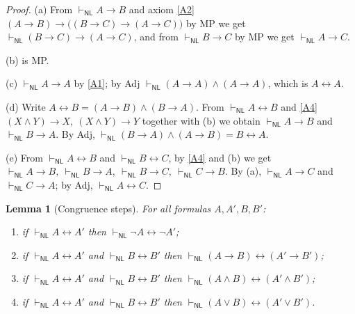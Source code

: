 \documentclass[12pt]{article}
\newtheorem{lemma}{Lemma}
\theoremstyle{definition}
\newcommand{\NL}{\mathsf{NL}}
\newcommand{\prv}{\vdash_{\NL}}
\newcommand{\imp}{\rightarrow}
\newcommand{\bic}{\leftrightarrow}
\begin{document}
\begin{proof}
(a) From $\prv A\imp B$ and axiom \eqref{A2}
$(A\imp B)\imp\big((B\imp C)\imp(A\imp C)\big)$ by MP we get
$\prv (B\imp C)\imp(A\imp C)$, and from $\prv B\imp C$ by MP we get
$\prv A\imp C$.

(b) is MP.

(c) $\prv A\imp A$ by \eqref{A1}; by Adj
$\prv (A\imp A)\wedge(A\imp A)$, which is $A\bic A$.

(d) Write $A\bic B=(A\imp B)\wedge(B\imp A)$. From $\prv A\bic B$ and \eqref{A4}
$(X\wedge Y)\imp X,\ (X\wedge Y)\imp Y$ together with (b) we obtain
$\prv A\imp B$ and $\prv B\imp A$. By Adj,
$\prv (B\imp A)\wedge(A\imp B)=B\bic A$.

(e) From $\prv A\bic B$ and $\prv B\bic C$, by \eqref{A4} and (b) we get
$\prv A\imp B,\ \prv B\imp A,\ \prv B\imp C,\ \prv C\imp B$. By (a),
$\prv A\imp C$ and $\prv C\imp A$; by Adj, $\prv A\bic C$.
\end{proof}

\begin{lemma}[Congruence steps]\label{lem:cong}
For all formulas $A,A',B,B'$:
\begin{enumerate}
\item[(i)] if $\prv A\bic A'$ then $\prv \neg A\bic\neg A'$;
\item[(ii)] if $\prv A\bic A'$ and $\prv B\bic B'$ then
$\prv (A\imp B)\bic(A'\imp B')$;
\item[(iii)] if $\prv A\bic A'$ and $\prv B\bic B'$ then
$\prv (A\wedge B)\bic(A'\wedge B')$;
\item[(iv)] if $\prv A\bic A'$ and $\prv B\bic B'$ then
$\prv (A\vee B)\bic(A'\vee B')$.
\end{enumerate}
\end{lemma}
\end{document}
